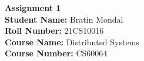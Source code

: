 \documentclass[12pt]{article}
\begin{document}
\begin{center}
    \textbf{\huge Assignment 1} \\[1em]
    \textbf{Student Name:} Bratin Mondal \\[0.5em]
    \textbf{Roll Number:} 21CS10016 \\[0.5em]
    \textbf{Course Name:} Distributed Systems \\[0.5em]
    \textbf{Course Number:} CS60064
\end{center}
















\end{document}
